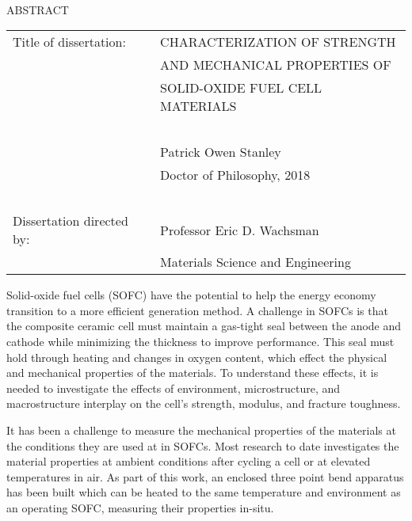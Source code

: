 

\hbox{\ }

\renewcommand{\baselinestretch}{1}
\small \normalsize

\begin{center}
\large{{ABSTRACT}}

\vspace{3em}

\end{center}
\hspace{-.15in}
\begin{tabular}{ll}
Title of dissertation:    & {\large  CHARACTERIZATION OF STRENGTH}\\
&				      {\large  AND MECHANICAL PROPERTIES OF  } \\
&				      {\large  SOLID-OXIDE FUEL CELL MATERIALS } \\
\ \\
&                          {\large  Patrick Owen Stanley} \\
&                           {\large Doctor of Philosophy, 2018}\\
\ \\
Dissertation directed by: & {\large  Professor Eric D. Wachsman} \\
&  				{\large	 Materials Science and Engineering } \\
\end{tabular}

\vspace{3em}

\renewcommand{\baselinestretch}{2}
\large \normalsize


Solid-oxide fuel cells (SOFC) have the potential to help the energy economy transition to a more efficient generation method.
A challenge in SOFCs is that the composite ceramic cell must maintain a gas-tight seal between the anode and cathode while minimizing the thickness to improve performance.
This seal must hold through heating and changes in oxygen content, which effect the physical and mechanical properties of the materials.
To understand these effects, it is needed to investigate the effects of environment, microstructure, and macrostructure interplay on the cell’s strength, modulus, and fracture toughness.

It has been a challenge to measure the mechanical properties of the materials at the conditions they are used at in SOFCs.
Most research to date investigates the material properties at ambient conditions after cycling a cell or at elevated temperatures in air.
As part of this work, an enclosed three point bend apparatus has been built which can be heated to the same temperature and environment as an operating SOFC, measuring their properties in-situ.

